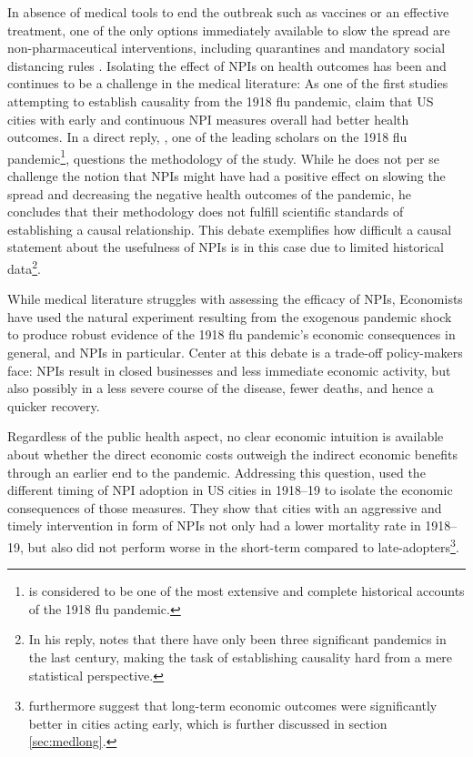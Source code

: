 \documentclass[12pt,a4paper]{article}
\begin{document}
In absence of medical tools to end the outbreak such as vaccines or an effective treatment, one of the only options  immediately available to slow the spread are non-pharmaceutical interventions, including quarantines and mandatory social distancing rules \citep{aledortNonpharmaceuticalPublicHealth2007}.
Isolating the effect of NPIs on health outcomes has been and continues to be a challenge in the medical literature:
As one of the first studies attempting to establish causality from the 1918 flu pandemic, \cite{markelNonpharmaceuticalInterventionsImplemented2007} claim that US cities with early and continuous NPI measures overall had better health outcomes.
In a direct reply, \cite{barryCommentsNonpharmaceuticalInterventions2007}, one of the leading scholars on the 1918 flu pandemic\footnote{\cite{barryGreatInfluenzaEpic2005} is considered to be one of the most extensive and complete historical accounts of the 1918 flu pandemic.}, questions the methodology of the study.
While he does not per se challenge the notion that NPIs might have had a positive effect on slowing the spread and decreasing the negative health outcomes of the pandemic, he concludes that their methodology does not fulfill scientific standards of establishing a causal relationship.
This debate exemplifies how difficult a causal statement about the usefulness of NPIs is in this case due to limited historical data\footnote{In his reply, \cite{barryCommentsNonpharmaceuticalInterventions2007} notes that there have only been three significant pandemics in the last century, making the task of establishing causality hard from a mere statistical perspective.}.

While medical literature struggles with assessing the efficacy of NPIs, Economists have used the natural experiment resulting from the exogenous pandemic shock to produce robust evidence of the 1918 flu pandemic's economic consequences in general, and NPIs in particular.
Center at this debate is a trade-off policy-makers face: NPIs result in closed businesses and less immediate economic activity, but also possibly in a less severe course of the disease, fewer deaths, and hence a quicker recovery.

Regardless of the public health aspect, no clear economic intuition is available about whether the direct economic costs outweigh the indirect economic benefits through an earlier end to the pandemic.
Addressing this question, \cite{correiaPandemicsDepressEconomy2020} used the different timing of NPI adoption in US cities in 1918--19 to isolate the economic consequences of those measures.
They show that cities with an aggressive and timely intervention in form of NPIs not only had a lower mortality rate in 1918--19, but also did not perform worse in the short-term compared to late-adopters\footnote{\cite{correiaPandemicsDepressEconomy2020} furthermore suggest that long-term economic outcomes were significantly better in cities acting early, which is further discussed in section \ref{sec:medlong}.}.
\end{document}
